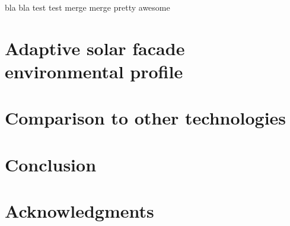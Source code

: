 \documentclass[preprint,12pt]{elsarticle}
\begin{document}
bla bla test test merge merge pretty awesome

\section{Adaptive solar facade environmental profile}
\label{profile}

\section{Comparison to other technologies}
\label{comparison}

\section{Conclusion}
\label{conclusion}

\section{Acknowledgments}
\label{acknowledgements}


\end{document}
